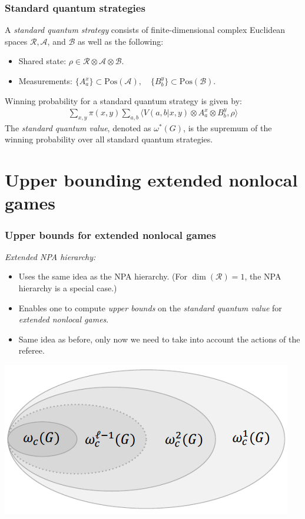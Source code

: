 \documentclass{beamer}
\newcommand{\biggip}[2]{\biggl\langle #1, #2 \biggr\rangle}
\def\A{\mathcal{A}}
\def\B{\mathcal{B}}
\def\R{\mathcal{R}}
\newcommand{\setft}[1]{\mathrm{#1}}
\newcommand{\Pos}{\setft{Pos}}
\begin{document}
\begin{frame}
	\frametitle{Standard quantum strategies}
	A \emph{standard quantum strategy} consists of finite-dimensional complex Euclidean spaces $\R,\A$, and $\B$ as well as the following:
	\begin{itemize}
		\item Shared state: $\rho \in \R \otimes \A \otimes \B$.

		\item Measurements: $\{ A_a^x \} \subset \Pos(\A), \quad \{ B_b^y \} \subset \Pos(\B)$.
	\end{itemize}
	\pause
	\vspace{5mm}
	Winning probability for a standard quantum strategy is given by:
	\begin{align*}
		\sum_{x,y} \pi(x,y) \sum_{a,b} \biggip{V(a,b|x,y) \otimes A_a^x \otimes B_b^y}{\rho}
	\end{align*}
	The \emph{standard quantum value}, denoted as $\omega^*(G)$, is the supremum of the winning probability over all standard quantum strategies.
\end{frame}

  \section{Upper bounding extended nonlocal games}


\begin{frame}
	\frametitle{Upper bounds for extended nonlocal games}
	\emph{Extended NPA hierarchy:}
	\begin{itemize}
		\item Uses the same idea as the NPA hierarchy. (For $\dim(\R) = 1$, the NPA hierarchy is a special case.)
		\item Enables one to compute \emph{upper bounds} on the \emph{standard quantum value} for \emph{extended nonlocal games}. 
		\item Same idea as before, only now we need to take into account the actions of the referee. 
	\end{itemize}
	\begin{center}
		\includegraphics[scale=0.5]{figures/CommutingValues}
	\end{center}	
\end{frame}
\end{document}
